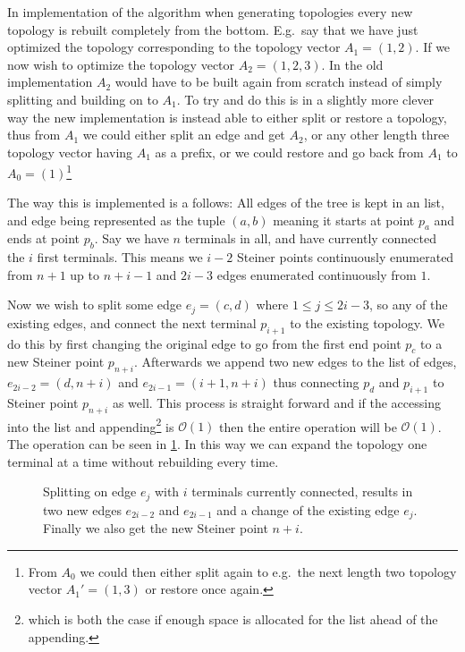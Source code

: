 In \textcite{smith1992} implementation of the algorithm when generating
topologies every new topology is rebuilt completely from the bottom. E.g.\ say
that we have just optimized the topology corresponding to the topology vector
$A_1 = (1, 2)$. If we now wish to optimize the topology vector
$A_2 = (1, 2, 3)$. In the old implementation $A_2$ would have to be built again
from scratch instead of simply splitting and building on to $A_1$. To try and do
this is in a slightly more clever way the new implementation is instead able to
either split or restore a topology, thus from $A_1$ we could either split an
edge and get $A_2$, or any other length three topology vector having $A_1$ as a
prefix, or we could restore and go back from $A_1$ to $A_0 = (1)$\footnote{From
  $A_0$ we could then either split again to e.g.\ the next length two topology
  vector $A_1' = (1, 3)$ or restore once again.}

The way this is implemented is a follows: All edges of the tree is kept in an
list, and edge being represented as the tuple $(a, b)$ meaning it starts at
point $p_a$ and ends at point $p_b$. Say we have $n$ terminals in all, and have
currently connected the $i$ first terminals. This means we $i-2$ Steiner points
continuously enumerated from $n+1$ up to $n+i-1$ and $2i-3$ edges enumerated
continuously from $1$.

Now we wish to split some edge $e_j = (c, d)$ where $1 \le j \le 2i-3$, so any
of the existing edges, and connect the next terminal $p_{i+1}$ to the existing
topology. We do this by first changing the original edge to go from the first
end point $p_c$ to a new Steiner point $p_{n+i}$. Afterwards we append two new
edges to the list of edges, $e_{2i-2} = (d, n+i)$ and $e_{2i-1} = (i+1, n+i)$
thus connecting $p_d$ and $p_{i+1}$ to Steiner point $p_{n+i}$ as well. This
process is straight forward and if the accessing into the list and
appending\footnote{which is both the case if enough space is allocated for the
  list ahead of the appending.} is $\mathcal{O}(1)$ then the entire operation
will be $\mathcal{O}(1)$. The operation can be seen in
\cref{fig:splitting-topology}. In this way we can expand the topology one
terminal at a time without rebuilding every time.

\begin{figure}[htbp]
  \centering
  
  \caption[Implementation of topology splitting]{Splitting on edge $e_j$ with
    $i$ terminals currently connected, results in two new edges $e_{2i-2}$ and
    $e_{2i-1}$ and a change of the existing edge $e_j$. Finally we also get the new
    Steiner point $n+i$.\label{fig:splitting-topology}}
\end{figure}

